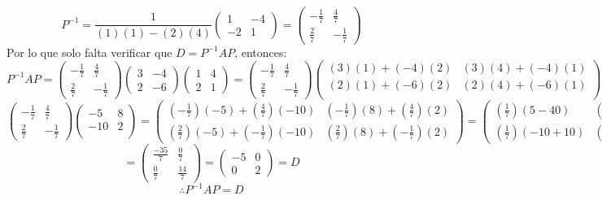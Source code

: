 \begin{itemize}
\begin{itemize}
\[P^{-1}=\frac{1}{(1)(1)-(2)(4)}\begin{pmatrix}1&-4\\-2&1\end{pmatrix}=\begin{pmatrix}-\frac{1}{7}&\frac{4}{7}\\\frac{2}{7}&-\frac{1}{7}\end{pmatrix}\]
Por lo que solo falta verificar que $D = P^{-1}AP$, entonces:
\[P^{-1}AP=\begin{pmatrix}-\frac{1}{7}&\frac{4}{7}\\\frac{2}{7}&-\frac{1}{7}\end{pmatrix}\begin{pmatrix}
3 &-4\\
2 &-6
\end{pmatrix}\begin{pmatrix}1&4\\2&1\end{pmatrix}=\begin{pmatrix}-\frac{1}{7}&\frac{4}{7}\\\frac{2}{7}&-\frac{1}{7}\end{pmatrix}\begin{pmatrix}
(3)(1)+(-4)(2) &(3)(4)+(-4)(1)\\
(2)(1)+(-6)(2) &(2)(4)+(-6)(1)\\
\end{pmatrix}\]\[\begin{pmatrix}-\frac{1}{7}&\frac{4}{7}\\\frac{2}{7}&-\frac{1}{7}\end{pmatrix}\begin{pmatrix}
-5 &8\\
-10 &2\\
\end{pmatrix}=\begin{pmatrix}\left(-\frac{1}{7}\right)(-5)+\left(\frac{4}{7}\right)(-10)&\left(-\frac{1}{7}\right)(8)+\left(\frac{4}{7}\right)(2)\\\left(\frac{2}{7}\right)(-5)+\left(-\frac{1}{7}\right)(-10)&\left(\frac{2}{7}\right)(8)+\left(-\frac{1}{7}\right)(2)\end{pmatrix}=\begin{pmatrix}\left(\frac{1}{7}\right)(5-40)&\left(\frac{1}{7}\right)(-8+8)\\\left(\frac{1}{7}\right)(-10+10)&\left(\frac{1}{7}\right)(16-2)\end{pmatrix}\]\[=\begin{pmatrix}\frac{-35}{7}&\frac{0}{7}\\\frac{0}{7}&\frac{14}{7}\end{pmatrix}=\begin{pmatrix}-5&0\\0&2\end{pmatrix}=D\]
\[\therefore P^{-1}AP=D\]



\end{itemize}
\end{itemize}
